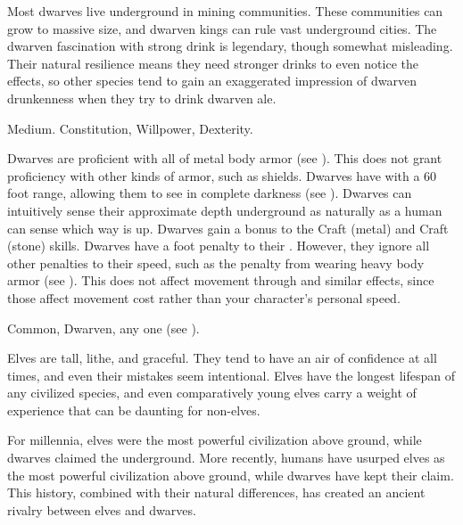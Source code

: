   Most dwarves live underground in mining communities.
  These communities can grow to massive size, and dwarven kings can rule vast underground cities.
  The dwarven fascination with strong drink is legendary, though somewhat misleading.
  Their natural resilience means they need stronger drinks to even notice the effects, so other species tend to gain an exaggerated impression of dwarven drunkenness when they try to drink dwarven ale.

   Medium.
    Constitution,  Willpower,  Dexterity.
  \begin{raggeditemize}
     Dwarves are proficient with all  of metal body armor (see ).
      This does not grant proficiency with other kinds of armor, such as shields.
     Dwarves have  with a 60 foot range, allowing them to see in complete darkness (see ).
     Dwarves can intuitively sense their approximate depth underground as naturally as a human can sense which way is up.
     Dwarves gain a  bonus to the Craft (metal) and Craft (stone) skills.
     Dwarves have a  foot penalty to their .
      However, they ignore all other penalties to their speed, such as the penalty from wearing heavy body armor (see ).
      This does not affect movement through  and similar effects, since those affect movement cost rather than your character's personal speed.
  \end{raggeditemize}
   Common, Dwarven, any one  (see ).


  Elves are tall, lithe, and graceful.
  They tend to have an air of confidence at all times, and even their mistakes seem intentional.
  Elves have the longest lifespan of any civilized species, and even comparatively young elves carry a weight of experience that can be daunting for non-elves.

  For millennia, elves were the most powerful civilization above ground, while dwarves claimed the underground.
  More recently, humans have usurped elves as the most powerful civilization above ground, while dwarves have kept their claim.
  This history, combined with their natural differences, has created an ancient rivalry between elves and dwarves.

